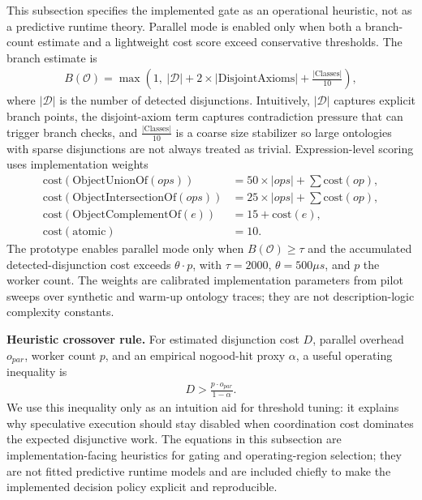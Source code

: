 \documentclass[preprint,12pt,times]{elsarticle}
\begin{document}
This subsection specifies the implemented gate as an operational heuristic, not as a predictive runtime theory. Parallel mode is enabled only when both a branch-count estimate and a lightweight cost score exceed conservative thresholds. The branch estimate is
\begin{align}
B(\mathcal{O}) = \max\left(1,\ |\mathcal{D}| + 2\times |\text{DisjointAxioms}| + \frac{|\text{Classes}|}{10}\right),
\end{align}
where $|\mathcal{D}|$ is the number of detected disjunctions. Intuitively, $|\mathcal{D}|$ captures explicit branch points, the disjoint-axiom term captures contradiction pressure that can trigger branch checks, and $\frac{|\text{Classes}|}{10}$ is a coarse size stabilizer so large ontologies with sparse disjunctions are not always treated as trivial. Expression-level scoring uses implementation weights
\begin{align}
\text{cost}(\text{ObjectUnionOf}(ops)) &= 50 \times |ops| + \sum \text{cost}(op), \\
\text{cost}(\text{ObjectIntersectionOf}(ops)) &= 25 \times |ops| + \sum \text{cost}(op), \\
\text{cost}(\text{ObjectComplementOf}(e)) &= 15 + \text{cost}(e), \\
\text{cost}(\text{atomic}) &= 10.
\end{align}
The prototype enables parallel mode only when $B(\mathcal{O}) \ge \tau$ and the accumulated detected-disjunction cost exceeds $\theta \cdot p$, with $\tau = 2000$, $\theta = 500\mu s$, and $p$ the worker count. The weights are calibrated implementation parameters from pilot sweeps over synthetic and warm-up ontology traces; they are not description-logic complexity constants.

\noindent\textbf{Heuristic crossover rule.}
For estimated disjunction cost $D$, parallel overhead $o_{par}$, worker count $p$, and an empirical nogood-hit proxy $\alpha$, a useful operating inequality is
\begin{align}
D > \frac{p \cdot o_{par}}{1 - \alpha}.
\end{align}
We use this inequality only as an intuition aid for threshold tuning: it explains why speculative execution should stay disabled when coordination cost dominates the expected disjunctive work.
The equations in this subsection are implementation-facing heuristics for gating and operating-region selection; they are not fitted predictive runtime models and are included chiefly to make the implemented decision policy explicit and reproducible.
\end{document}
